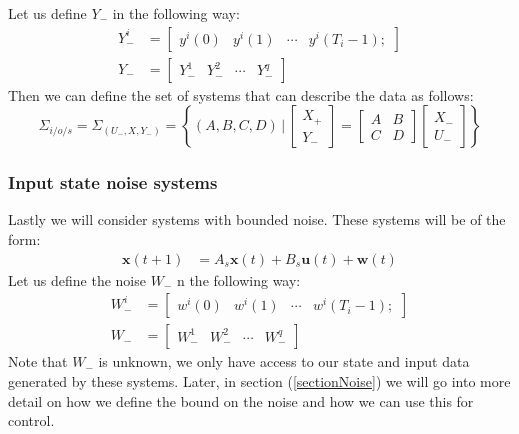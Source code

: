 Let us define $Y_-$ in the following way:
\begin{align*}
	Y_-^i &= \begin{bmatrix} y^i(0) & y^i(1)& \cdots & y^i(T_i-1); \end{bmatrix}\\
	Y_-   &= \begin{bmatrix} Y_-^1  & Y_-^2 & \cdots & Y_-^q	\end{bmatrix}
\end{align*}
Then we can define the set of systems that can describe the data as follows:
\begin{equation}
\label{isoSet} 
\Sigma_{i/o/s} = 
\Sigma_{(U_-,X, Y_-)} = \left\{ (A, B, C, D) \, | \, 
\begin{bmatrix} X_{+} \\ Y_{-} \end{bmatrix} = 
\begin{bmatrix} A & B \\ C & D \end{bmatrix} 
\begin{bmatrix} X_{-} \\ U_{-} \end{bmatrix} \right\} 
\end{equation}


\subsubsection*{Input state noise systems}
Lastly we will consider systems with bounded noise. These systems will be of the form:
\begin{align} \label{isnSystem}
	\mathbf{x}(t+1) &= A_s \mathbf{x}(t) + B_s \mathbf{u}(t) + \mathbf{w}(t)
\end{align}
Let us define the noise $W_-$ n the following way:
\begin{align*}
W_-^i &= \begin{bmatrix} w^i(0) & w^i(1)& \cdots & w^i(T_i-1); \end{bmatrix}\\
W_-   &= \begin{bmatrix} W_-^1  & W_-^2 & \cdots & W_-^q	\end{bmatrix}
\end{align*}
Note that $W_-$ is unknown, we only have access to our state and input data generated by these systems. Later, in section (\ref{sectionNoise}) we will go into more detail on how we define the bound on the noise and how we can use this for control.









